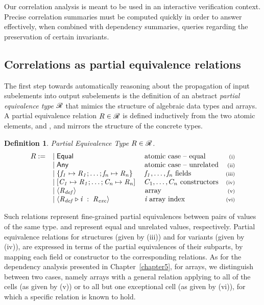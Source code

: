 \documentclass[11pt]{article}
\newtheorem{definition}{Definition}
\newcommand{\snumber}[1]{\textrm{{\scriptsize(#1)}}}
\newcommand{\ver}{\arrowvert \;}
\begin{document}
Our correlation analysis is meant to be used in an interactive verification 
context. Precise correlation summaries must be computed quickly in order to 
answer effectively, when combined with dependency summaries, queries 
regarding the preservation of certain invariants. 


\subsection{Correlations as partial equivalence relations}

The first step towards automatically reasoning about the propagation of input
subelements into output subelements is the definition of an abstract 
\emph{partial equivalence type} $\mathscr{R}$ that mimics the structure of algebraic 
data types and arrays. A partial equivalence relation $R \in \mathscr{R}$ is defined 
inductively from the two atomic elements, {\equal} and \qmark, and mirrors the 
structure of the concrete types. 

\begin{definition}\label{corpertyppe}
{Partial Equivalence Type $R \in \mathscr{R}$.}
\[
\begin{array}{lllr}
 \rel :=  &\ver \equal                &\; \textrm{atomic case -- equal} &\snumber{i}\\
          &\ver \qmark                &\; \textrm{atomic case -- unrelated} & \snumber{ii}\\
          & \mathit{\ver \rels}
          & \; \mathit{f_1, \ldots, f_n}  \textrm{  fields} & \snumber{iii}\\
          & \ver \mathit{\relv} 
          & \; C_1, \ldots, C_n  \textrm{  constructors} & \snumber{iv}\\
          & \mathit{\ver \arel{\rel_{def}}} &\textrm{  array} & \textrm{\scriptsize(v)} \\
          & \mathit{\ver \relai} 
          & \; \mathit{i} \; \textrm{array index} & \textrm{\scriptsize(vi)} 
\end{array} 
\]
\end{definition}

\noindent Such relations represent fine-grained partial equivalences between
pairs of values of the same type. {\equal} and {\qmark} represent equal and
unrelated values, respectively. Partial equivalence relations for structures
(given by (iii)) and for variants (given by (iv)), are expressed in terms of the
partial equivalences of their subparts, by mapping each field or constructor to
the corresponding relations. As for the dependency analysis presented in
Chapter~\ref{chapter5}, for arrays, we distinguish between two cases, namely
arrays with a general relation applying to all of the cells (as given by (v)) or
to all but one exceptional cell (as given by (vi)), for which a specific
relation is known to hold.
\end{document}
